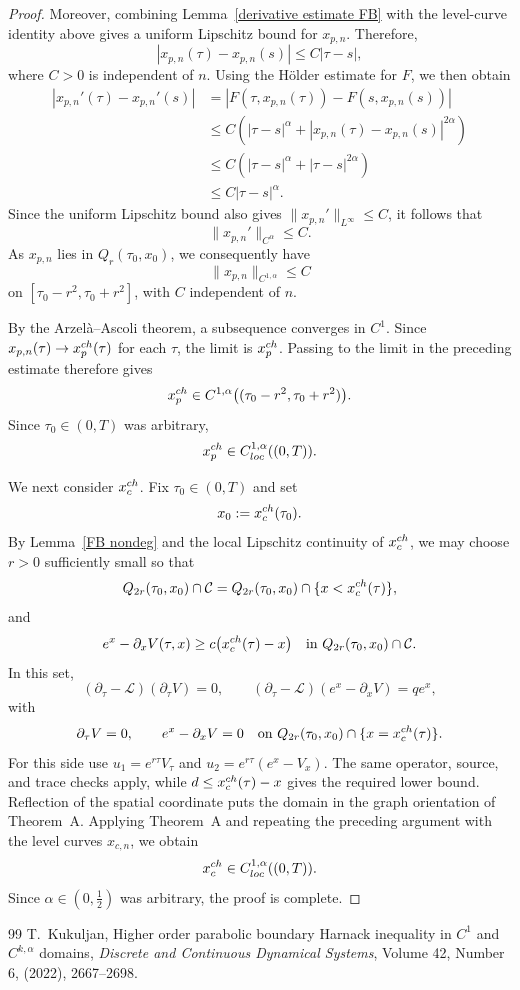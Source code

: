 \documentclass[10pt,a4paper]{amsart}
\begin{document}
\begin{proof}
Moreover, combining Lemma~\ref{derivative estimate FB} with the
level-curve identity above gives a uniform Lipschitz bound for
$x_{p,n}$. Therefore,
\[
    |x_{p,n}(\tau)-x_{p,n}(s)|
    \leq C|\tau-s|,
\]
where $C>0$ is independent of $n$. Using the H\"older estimate for
$F$, we then obtain
\[
\begin{aligned}
    |x_{p,n}'(\tau)-x_{p,n}'(s)|
    &=
    \left|
        F(\tau,x_{p,n}(\tau))
        -F(s,x_{p,n}(s))
    \right| \\
    &\leq
    C\left(
        |\tau-s|^\alpha
        +|x_{p,n}(\tau)-x_{p,n}(s)|^{2\alpha}
    \right) \\
    &\leq
    C\left(
        |\tau-s|^\alpha+|\tau-s|^{2\alpha}
    \right) \\
    &\leq
    C|\tau-s|^\alpha.
\end{aligned}
\]
Since the uniform Lipschitz bound also gives
$\|x_{p,n}'\|_{L^\infty}\leq C$, it follows that
\[
    \|x_{p,n}'\|_{C^\alpha}\leq C.
\]
As $x_{p,n}$ lies in $Q_r(\tau_0,x_0)$, we consequently have
\[
    \|x_{p,n}\|_{C^{1,\alpha}}\leq C
\]
on $[\tau_0-r^2,\tau_0+r^2]$, with $C$ independent of $n$.

By the Arzel\`a--Ascoli theorem, a subsequence converges in $C^1$.
Since $x_{p,n}(\tau)\to x_p^{\rm ch}(\tau)$ for each $\tau$, the limit
is $x_p^{\rm ch}$. Passing to the limit in the preceding estimate
therefore gives
\[
    x_p^{\rm ch}\in C^{1,\alpha}
    \bigl((\tau_0-r^2,\tau_0+r^2)\bigr).
\]
Since $\tau_0\in(0,T)$ was arbitrary,
\[
    x_p^{\rm ch}\in C_{\rm loc}^{1,\alpha}((0,T)).
\]

We next consider $x_c^{\rm ch}$.
Fix $\tau_0\in(0,T)$ and set
\[
    x_0:=x_c^{\rm ch}(\tau_0).
\]
By Lemma~\ref{FB nondeg} and the local Lipschitz continuity of
$x_c^{\rm ch}$, we may choose $r>0$ sufficiently small so that
\[
    Q_{2r}(\tau_0,x_0)\cap\mathcal C
    =
    Q_{2r}(\tau_0,x_0)\cap\{x<x_c^{\rm ch}(\tau)\},
\]
and
\[
    e^x-\partial_xV(\tau,x)
    \geq
    c\bigl(x_c^{\rm ch}(\tau)-x\bigr)
    \quad\text{in }
    Q_{2r}(\tau_0,x_0)\cap\mathcal C.
\]
In this set,
\[
    (\partial_\tau-\mathcal L)(\partial_\tau V)=0,
    \qquad
    (\partial_\tau-\mathcal L)(e^x-\partial_xV)=qe^x,
\]
with
\[
    \partial_\tau V=0,
    \qquad
    e^x-\partial_xV=0
    \quad\text{on }
    Q_{2r}(\tau_0,x_0)\cap\{x=x_c^{\rm ch}(\tau)\}.
\]
{
For this side use $u_1=e^{r\tau}V_\tau$ and
$u_2=e^{r\tau}(e^x-V_x)$. The same operator, source, and trace
checks apply, while $d\leq x_c^{\rm ch}(\tau)-x$ gives the
required lower bound. Reflection of the spatial coordinate puts the
domain in the graph orientation of Theorem~A.
} Applying Theorem~A and repeating the preceding argument with the
level curves $x_{c,n}$, we obtain
\[
    x_c^{\rm ch}\in C_{\rm loc}^{1,\alpha}((0,T)).
\]
Since $\alpha\in(0,\frac12)$ was arbitrary, the proof is complete.
\end{proof}

\begin{thebibliography}{99}
 T.~Kukuljan, Higher order parabolic boundary Harnack inequality in $C^1$ and $C^{k,\alpha}$ domains, \textit{Discrete and Continuous Dynamical Systems}, Volume 42, Number 6, (2022), 2667--2698.
\end{thebibliography}
\end{document}
